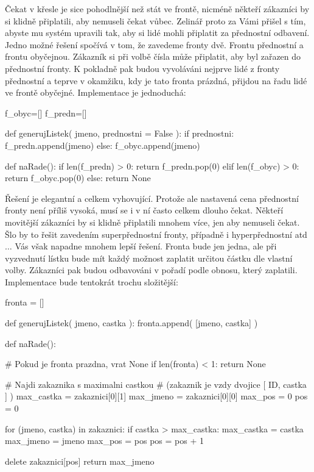 Čekat v křesle je sice pohodlnější než stát ve frontě, nicméně někteří zákazníci by si klidně připlatili, aby nemuseli čekat vůbec. Zelinář proto
za Vámi přišel s tím, abyste mu systém upravili tak, aby si lidé mohli připlatit za přednostní odbavení. Jedno možné řešení spočívá v tom, že zavedeme
fronty dvě. Frontu přednostní a frontu obyčejnou. Zákazník si při volbě čísla může připlatit, aby byl zařazen do přednostní fronty. K pokladně pak budou
vyvoláváni nejprve lidé z fronty přednostní a teprve v okamžiku, kdy je tato fronta prázdná, přijdou na řadu lidé ve frontě obyčejné. Implementace
je jednoduchá:

\begin{python}
f_obyc=[]
f_predn=[]

def generujListek( jmeno, prednostni = False ):
    if prednostni:
        f_predn.append(jmeno)
    else:
        f_obyc.append(jmeno)
    
def naRade():
    if len(f_predn) > 0:
        return f_predn.pop(0)
    elif len(f_obyc) > 0:
        return f_obyc.pop(0)
    else:
        return None
\end{python}

Řešení je elegantní a celkem vyhovující. Protože ale nastavená cena přednostní fronty není příliš vysoká, musí se i v ní často celkem dlouho čekat. 
Někteří movitější zákazníci by si klidně připlatili mnohem více, jen aby nemuseli čekat. Šlo by to řešit zavedením superpřednostní fronty, případně
i hyperpřednostní atd $\ldots$ Vás však napadne mnohem lepší řešení. Fronta bude jen jedna, ale při vyzvednutí lístku bude mít každý možnost zaplatit
určitou částku dle vlastní volby. Zákazníci pak budou odbavováni v pořadí podle obnosu, který zaplatili. Implementace bude tentokrát trochu
složitější:


\begin{python}
fronta = []

def generujListek( jmeno, castka ):
    fronta.append( [jmeno, castka] )


def naRade():

    # Pokud je fronta prazdna, vrat None
    if len(fronta) < 1:
      return None
      
    # Najdi zakaznika s maximalni castkou
    # (zakaznik je vzdy dvojice [ ID, castka ] )
    max_castka = zakaznici[0][1]
    max_jmeno     = zakaznici[0][0]
    max_pos    = 0
    pos        = 0
    
    for (jmeno, castka) in zakaznici:
        if castka > max_castka:
	    max_castka = castka
            max_jmeno = jmeno
            max_pos = pos
        pos = pos + 1
    
    delete zakaznici[pos]
    return max_jmeno
\end{python}


